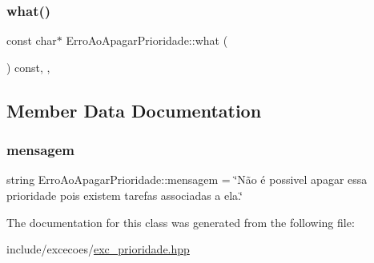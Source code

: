 \subsubsection{\texorpdfstring{what()}{what()}}
{\footnotesize\ttfamily const char$\ast$ Erro\+Ao\+Apagar\+Prioridade\+::what (\begin{DoxyParamCaption}{ }\end{DoxyParamCaption}) const\hspace{0.3cm}{\ttfamily [inline]}, {\ttfamily [override]}, {\ttfamily [noexcept]}}



\subsection{Member Data Documentation}
\mbox{\label{classErroAoApagarPrioridade_a97a77cb489c4dfea2fcd9084c31633e8}} 
\subsubsection{\texorpdfstring{mensagem}{mensagem}}
{\footnotesize\ttfamily string Erro\+Ao\+Apagar\+Prioridade\+::mensagem = \char`\"{}Não é possivel apagar essa prioridade pois existem tarefas associadas a ela.\char`\"{}\hspace{0.3cm}{\ttfamily [private]}}



The documentation for this class was generated from the following file\+:\begin{DoxyCompactItemize}
\item 
include/excecoes/\hyperlink{exc__prioridade_8hpp}{exc\+\_\+prioridade.\+hpp}\end{DoxyCompactItemize}
